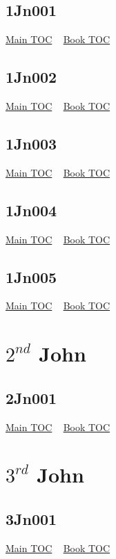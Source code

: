 \documentclass{book}
\begin{document}
  \section{1Jn001}\hyperlink{toc}{Main TOC} ~ \hyperref[subsec:1Jn]{Book TOC} 
  \section{1Jn002}\hyperlink{toc}{Main TOC} ~ \hyperref[subsec:1Jn]{Book TOC} 
  \section{1Jn003}\hyperlink{toc}{Main TOC} ~ \hyperref[subsec:1Jn]{Book TOC} 
  \section{1Jn004}\hyperlink{toc}{Main TOC} ~ \hyperref[subsec:1Jn]{Book TOC} 
  \section{1Jn005}\hyperlink{toc}{Main TOC} ~ \hyperref[subsec:1Jn]{Book TOC} 
  \chapter{$2^{nd}$ John} \label{subsec:2Jn} \begin{multicols}{2} \minitoc \end{multicols}
  \section{2Jn001}\hyperlink{toc}{Main TOC} ~ \hyperref[subsec:2Jn]{Book TOC} 
  \chapter{$3^{rd}$ John} \label{subsec:3Jn} \begin{multicols}{2} \minitoc \end{multicols}
  \section{3Jn001}\hyperlink{toc}{Main TOC} ~ \hyperref[subsec:3Jn]{Book TOC} 
\end{document}
